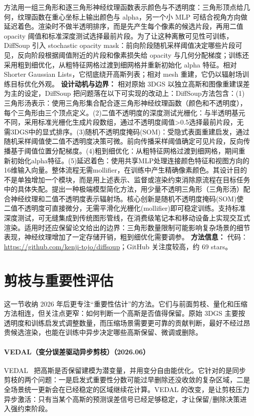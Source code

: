 方法用一组三角形和逐三角形神经纹理函数表示颜色与不透明度：三角形顶点给几何，纹理函数在重心坐标上输出颜色与 alpha，另一个小 MLP 可结合视角方向做延迟着色。渲染时不做半透明排序，而是先产生每个像素的候选片段，再用二值 opacity 阈值和标准深度测试选择最前片段。为了让这种离散可见性可训练，DiffSoup 引入 stochastic opacity mask：前向阶段随机采样阈值决定哪些片段可见，反向阶段根据阈值附近的片段和像素损失给 opacity 与几何分配梯度；训练还采用粗到细优化，从粗特征网格过渡到细网格并重新初始化 alpha 特征。相对 Shorter Gaussian Lists，它彻底绕开高斯列表；相对 mesh 重建，它仍以辐射场训练目标优化外观。
\textbf{设计动机与边界：} 相对原始 3DGS 以独立高斯和图像重建误差为主的设定，DiffSoup 把问题落在以下可实现的改动上：DiffSoup方法包含：(1)三角形汤表示：使用三角形集合配合逐三角形神经纹理函数（颜色和不透明度），每个三角形由三个顶点定义。(2)二值不透明度的深度测试光栅化：与半透明基元不同，采用标准光栅化生成片段数组，通过不透明度阈值>0.5选择最前片段，无需3DGS中的显式排序。(3)随机不透明度掩码(SOM)：受隐式表面重建启发，通过随机采样阈值使二值不透明度决策可微。前向传播采样阈值确定可见片段，反向传播基于阈值位置分配梯度。(4)粗到细优化：从粗特征网格过渡到细网格，期间重新初始化alpha特征。(5)延迟着色：使用共享MLP处理连接颜色特征和视图方向的16维输入向量。整体流程无需mollifier，在训练中产生精确像素颜色。其设计目的不是单独增加一个模块，而是用上述表示、监督或渲染约束消除原流程在目标任务中的具体失配。提出一种极端模型简化方法，用少量不透明三角形（三角形汤）配合神经纹理和二值不透明度表示辐射场。核心创新是随机不透明度掩码(SOM)使二值不透明度可直接微分，无需平滑化光栅化(mollifier)即可稳定训练。支持标准深度测试，可无缝集成到传统图形管线，在消费级笔记本和移动设备上实现交互式渲染。适用时还应保留论文给出的边界：三角形数量限制可能影响复杂场景的细节表现，神经纹理增加了一定存储开销，粗到细优化需要调参。
\textbf{方法信息：} 代码：\url{https://github.com/kenji-tojo/diffsoup}；GitHub 关注度较高，约 69 stars。



\section{剪枝与重要性评估}

这一节收纳 2026 年后更专注“重要性估计”的方法。它们与前面剪枝、量化和压缩方法相连，但关注点更窄：如何判断一个高斯是否值得保留。原始 3DGS 主要按透明度和训练启发式调整数量，而压缩场景需要更可靠的贡献判断，最好不经过昂贵候选渲染，也能在训练中异步决定哪些高斯保留、微调或删除。


\paragraph{VEDAL（变分误差驱动异步剪枝）（2026.06）}
VEDAL~\cite{2606_02346} 把高斯是否保留建模为潜变量，并用变分自由能优化。它针对的是同步剪枝的两个问题：一是启发式重要性分数可能过早删除还没收敛的复杂区域，二是全场景统一更新会在已经稳定的区域继续花计算。VEDAL 的改变，是让剪枝压力异步激活：只有当某个高斯的预测误差信号已经足够稳定，才让保留/删除决策进入强约束阶段。

